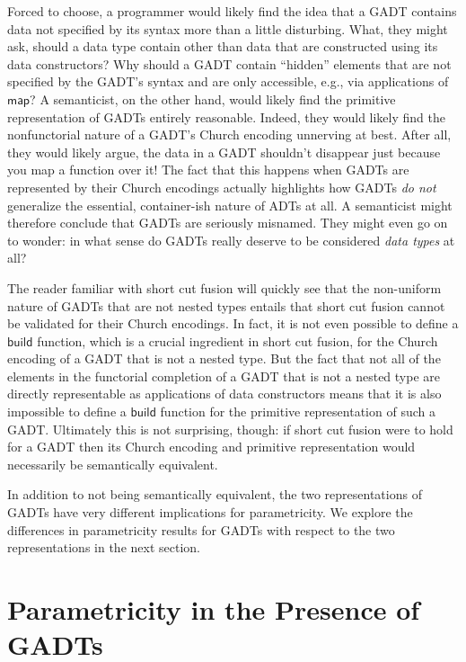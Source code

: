 \documentclass[acmsmall,screen,review,anonymous]{acmart}
\theoremstyle{definition}
\begin{document}
Forced to choose, a programmer would likely find the idea that a GADT
contains data not specified by its syntax more than a little
disturbing. What, they might ask, should a data type contain other
than data that are constructed using its data constructors? Why should
a GADT contain ``hidden'' elements that are not specified by the
GADT's syntax and are only accessible, e.g., via applications of
$\mathsf{map}$? A semanticist, on the other hand, would likely find
the primitive representation of GADTs entirely reasonable. Indeed,
they would likely find the nonfunctorial nature of a GADT's Church
encoding unnerving at best. After all, they would likely argue, the
data in a GADT shouldn't disappear just because you map a function
over it! The fact that this happens when GADTs are represented by
their Church encodings actually highlights how GADTs {\em do not}
generalize the essential, container-ish nature of ADTs at all. A
semanticist might therefore conclude that GADTs are seriously
misnamed. They might even go on to wonder: in what sense do GADTs
really deserve to be considered {\em data types} at all?

The reader familiar with short cut fusion will quickly see that the
non-uniform nature of GADTs that are not nested types entails that
short cut fusion cannot be validated for their Church encodings. In
fact, it is not even possible to define a $\mathsf{build}$ function,
which is a crucial ingredient in short cut fusion, for the Church
encoding of a GADT that is not a nested type. But the fact that not
all of the elements in the functorial completion of a GADT that is not
a nested type are directly representable as applications of data
constructors means that it is also impossible to define a
$\mathsf{build}$ function for the primitive representation of such a
GADT. Ultimately this is not surprising, though: if short cut fusion
were to hold for a GADT then its Church encoding and primitive
representation would necessarily be semantically equivalent.

In addition to not being semantically equivalent, the two
representations of GADTs have very different implications for
parametricity. We explore the differences in parametricity results for
GADTs with respect to the two representations in the next section.

\section{Parametricity in the Presence of GADTs}\label{sec:par}
\end{document}

